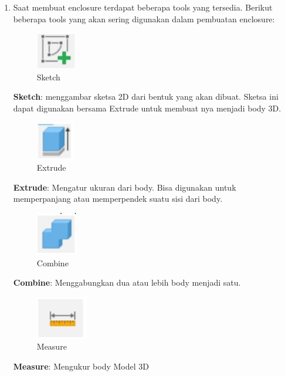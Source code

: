 \begin{enumerate}
    \item Saat membuat enclosure terdapat beberapa tools yang tersedia. Berikut beberapa tools yang
    akan sering digunakan dalam pembuatan enclosure:
        \begin{figure}[H]
            \centering
            \includegraphics[width=0.1\linewidth]{P3/img/image6.jpg}
            \caption{Sketch}
            \label{fig:Sketch}
        \end{figure}
        
        \textbf{Sketch}: menggambar sketsa 2D dari bentuk yang akan dibuat. Sketsa ini dapat digunakan
        bersama Extrude untuk membuat nya menjadi body 3D.
            
        \begin{figure}[H]
            \centering
            \includegraphics[width=0.1\linewidth]{P3/img/image7.jpg}
            \caption{Extrude}
            \label{fig:Extrude}
        \end{figure}

        \textbf{Extrude}: Mengatur ukuran dari body. Bisa digunakan untuk memperpanjang atau
        memperpendek suatu sisi dari body.
        \begin{figure}[H]
            \centering
            \includegraphics[width=0.1\linewidth]{P3/img/image8.jpg}
            \caption{Combine}
            \label{fig:Combine}
        \end{figure}
    
        \textbf{Combine}: Menggabungkan dua atau lebih body menjadi satu.
            
        \begin{figure}[H]
            \centering
            \includegraphics[width=0.1\linewidth]{P3/img/image9.jpg}
            \caption{Measure}
            \label{fig:Measure}
        \end{figure}
        \textbf{Measure}: Mengukur body Model 3D
            

\end{enumerate}
